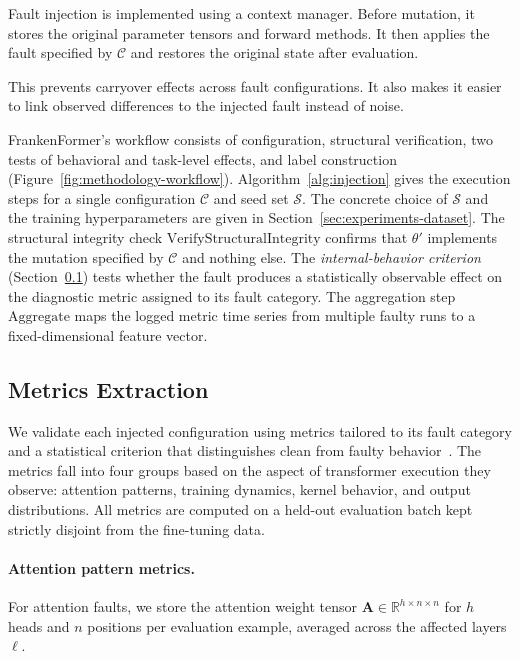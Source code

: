 Fault injection is implemented using a context manager. Before mutation, it stores the original parameter tensors and forward methods. It then applies the fault specified by $\mathcal{C}$ and restores the original state after evaluation.

This prevents carryover effects across fault configurations. It also makes it easier to link observed differences to the injected fault instead of noise.

FrankenFormer's workflow consists of configuration, structural verification, two tests of behavioral and task-level effects, and label construction (Figure~\ref{fig:methodology-workflow}).
Algorithm~\ref{alg:injection} gives the execution steps for a single configuration $\mathcal{C}$ and seed set $\mathcal{S}$. The concrete choice of $\mathcal{S}$ and the training hyperparameters are given in Section~\ref{sec:experiments-dataset}.
The structural integrity check $\text{VerifyStructuralIntegrity}$ confirms that $\theta'$ implements the mutation specified by $\mathcal{C}$ and nothing else.
The \emph{internal-behavior criterion} (Section~\ref{subsec:metrics}) tests whether the fault produces a statistically observable effect on the diagnostic metric assigned to its fault category.
The aggregation step $\text{Aggregate}$ maps the logged metric time series from multiple faulty runs to a fixed-dimensional feature vector.

\subsection{Metrics Extraction}
\label{subsec:metrics}

We validate each injected configuration using metrics tailored to its fault category and a statistical criterion that distinguishes clean from faulty behavior~\citep{Tian2017,deepfd,mosbach2021stability}. The metrics fall into four groups based on the aspect of transformer execution they observe: attention patterns, training dynamics, kernel behavior, and output distributions. All metrics are computed on a held-out evaluation batch kept strictly disjoint from the fine-tuning data.

\paragraph{Attention pattern metrics.}
For attention faults, we store the attention weight tensor $\mathbf{A} \in \mathbb{R}^{h \times n \times n}$ for $h$ heads and $n$ positions per evaluation example, averaged across the affected layers $\ell$.

